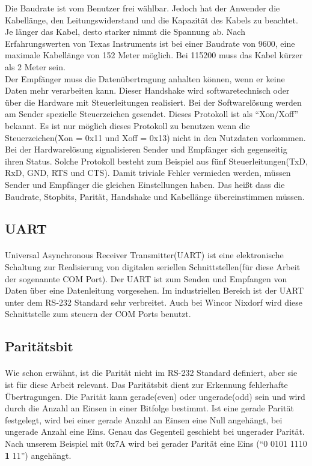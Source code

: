 Die Baudrate ist vom Benutzer frei wählbar. Jedoch hat der Anwender die Kabellänge, den Leitungswiderstand und die Kapazität des Kabels zu beachtet. Je länger das Kabel, desto starker nimmt die Spannung ab. Nach Erfahrungswerten von Texas Instruments ist bei einer Baudrate von 9600, eine maximale Kabellänge von 152 Meter möglich. Bei 115200 muss das Kabel kürzer als 2 Meter sein.\\

Der Empfänger muss die Datenübertragung anhalten können, wenn er keine Daten mehr verarbeiten kann. Dieser Handshake wird softwaretechnisch oder über die Hardware mit Steuerleitungen realisiert. Bei der Softwarelösung werden am Sender spezielle Steuerzeichen gesendet. Dieses Protokoll ist als "`Xon/Xoff"' bekannt. Es ist nur möglich dieses Protokoll zu benutzen wenn die Steuerzeichen(Xon = 0x11 und Xoff = 0x13) nicht in den Nutzdaten vorkommen. Bei der Hardwarelösung signalisieren Sender und Empfänger sich gegenseitig ihren Status. Solche Protokoll besteht zum Beispiel aus fünf Steuerleitungen(TxD, RxD, GND, RTS und CTS). Damit triviale Fehler vermieden werden, müssen Sender und Empfänger die gleichen Einstellungen haben. Das heißt dass die Baudrate, Stopbits, Parität, Handshake und Kabellänge übereinstimmen müssen.


\subsection{UART}
\paragraph{}
Universal Asynchronous Receiver Transmitter(UART) ist eine elektronische Schaltung zur Realisierung von digitalen seriellen Schnittstellen(für diese Arbeit der sogenannte COM Port). Der UART ist zum Senden und Empfangen von Daten über eine Datenleitung vorgesehen. Im industriellen Bereich ist der UART unter dem RS-232 Standard sehr verbreitet. Auch bei Wincor Nixdorf wird diese Schnittstelle zum steuern der COM Ports benutzt.

\subsection{Paritätsbit}
\paragraph{}
Wie schon erwähnt, ist die Parität nicht im RS-232 Standard definiert, aber sie ist für diese Arbeit relevant. Das Paritätsbit dient zur Erkennung fehlerhafte Übertragungen. Die Parität kann gerade(even) oder ungerade(odd) sein und wird durch die Anzahl an Einsen in einer Bitfolge bestimmt. Ist eine gerade Parität festgelegt, wird bei einer gerade Anzahl an Einsen eine Null angehängt, bei ungerade Anzahl eine Eins. Genau das Gegenteil geschieht bei  ungerader Parität. Nach unserem Beispiel mit 0x7A wird bei gerader Parität eine Eins ("`0 0101 1110 \textbf{1} 11"') angehängt.

